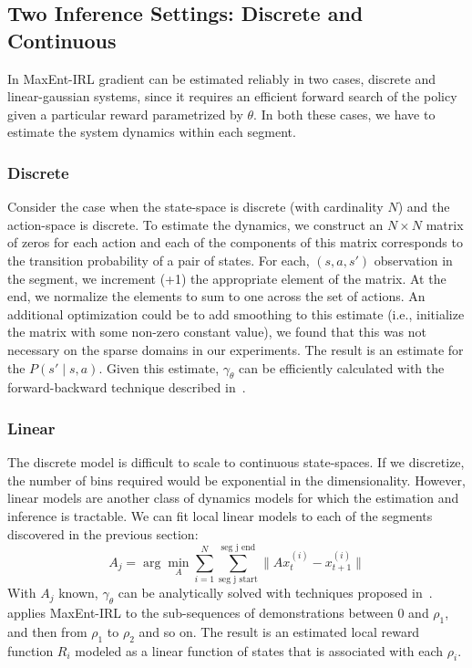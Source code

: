 \subsection{Two Inference Settings: Discrete and Continuous}
In MaxEnt-IRL gradient can be estimated reliably in two cases, discrete and linear-gaussian systems, since it requires an efficient forward search of the policy given a particular reward parametrized by $\theta$.
In both these cases, we have to estimate the system dynamics within each segment.

\subsubsection{Discrete}
Consider the case when the state-space is discrete (with cardinality $N$) and the action-space is discrete. 
To estimate the dynamics, we construct an $N \times N$ matrix of zeros for each action and each of the components 
of this matrix corresponds to the transition probability of a pair of states.
For each, $(s,a,s')$ observation in the segment, we increment (+1) the appropriate element of the matrix.
At the end, we normalize the elements to sum to one across the set of actions.
An additional optimization could be to add smoothing to this estimate (i.e., initialize the matrix with some non-zero constant value), we found that this was not necessary on the sparse domains in our experiments.
The result is an estimate for the $P(s' \mid s, a)$.
Given this estimate, $\gamma_{\theta}$ can be efficiently calculated with the forward-backward technique described in~\citep{DBLP:conf/aaai/ZiebartMBD08}.

\subsubsection{Linear}
The discrete model is difficult to scale to continuous state-spaces.
If we discretize, the number of bins required would be exponential in the dimensionality.
However, linear models are another class of dynamics models for which the estimation and inference is tractable.
We can fit local linear models to each of the segments discovered in the previous section:
\[
A_j = \arg\min_{A} \sum_{i=1}^N \sum_{\text{seg j start}}^{\text{seg j end}} \|A x^{(i)}_{t} - x^{(i)}_{t+1}\|
\]
With $A_j$ known, $\gamma_{\theta}$ can be analytically solved with techniques proposed in~\citep{ziebart2012probabilistic}.
\hirl applies MaxEnt-IRL to the sub-sequences of demonstrations between 0 and $\rho_1$, and then from $\rho_1$ to $\rho_2$ and so on.
The result is an estimated local reward function $R_{i}$ modeled as a linear function of states that is associated with each $\rho_i$.

